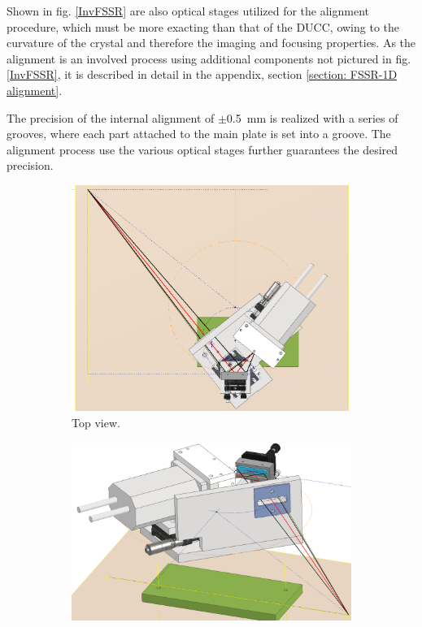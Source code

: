 Shown in fig. \ref{InvFSSR} are also optical stages utilized 
for the 
alignment procedure, which 
must be more exacting than that of the DUCC, owing to the 
curvature of the 
crystal and therefore the imaging and focusing properties. 
As the 
alignment is 
an involved process using additional components not pictured 
in fig. 
\ref{InvFSSR}, it is described in detail in the appendix, section 
\ref{section: 
	FSSR-1D alignment}.

The precision of the internal alignment of $\pm$\SI{0.5}{\milli\meter} is 
realized with a series of grooves, where each part attached to the main plate 
is set into a groove. The alignment process use the various optical stages 
further guarantees the desired precision.


\begin{figure} [H]
	\centering
	\begin{subfigure}[t]{0.42\textwidth}
		\includegraphics[width=\textwidth]{InventorPics/FSSRFullTop.PNG}
		\caption{Top view.}
		\label{InvFSSRFullTop}
	\end{subfigure}%
	\hfill
	\begin{subfigure}[t]{0.56\textwidth}
	\centering
		\includegraphics[width=\textwidth]{InventorPics/FSSRFullFront.PNG}

\end{subfigure}
\end{figure}
